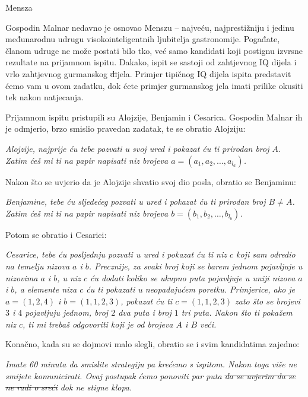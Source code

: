 \begin{statement}[
  problempoints=100,
  timelimit=1 sekunda,
  memorylimit=512 MiB,
]{Mensza}

Gospodin Malnar nedavno je osnovao Menszu -- najveću, najprestižniju i jedinu
međunarodnu udrugu visokointeligentnih ljubitelja gastronomije. Pogađate, članom
udruge ne može postati bilo tko, već samo kandidati koji postignu izvrsne
rezultate na prijamnom ispitu. Dakako, ispit se sastoji od zahtjevnog IQ dijela
i vrlo zahtjevnog gurmanskog \sout{di}jela. Primjer tipičnog IQ dijela ispita
predstavit ćemo vam u ovom zadatku, dok ćete primjer gurmanskog jela imati
prilike okusiti tek nakon natjecanja.

Prijamnom ispitu pristupili su Alojzije, Benjamin i Cesarica. Gospodin Malnar
ih je odmjerio, brzo smislio pravedan zadatak, te se obratio Alojziju:

\textit{Alojzije, najprije ću tebe pozvati u svoj ured i pokazat ću ti prirodan
  broj $A$.  Zatim ćeš mi ti na papir napisati niz brojeva $a = (a_1, a_2,
\ldots, a_{l_a})$.}

Nakon što se uvjerio da je Alojzije shvatio svoj dio posla, obratio se Benjaminu:

\textit{Benjamine, tebe ću sljedećeg pozvati u ured i pokazat ću ti prirodan
  broj $B \ne A$.  Zatim ćeš mi ti na papir napisati niz brojeva $b = (b_1, b_2,
\ldots, b_{l_b})$.}

Potom se obratio i Cesarici:

\textit{Cesarice, tebe ću posljednju pozvati u ured i pokazat ću ti niz $c$ koji
  sam odredio na temelju nizova $a$ i $b$. Precznije, za svaki broj koji se barem
  jednom pojavljuje u nizovima $a$ i $b$, u niz $c$ ću dodati koliko se ukupno puta
  pojavljuje u uniji nizova $a$ i $b$, a elemente niza $c$ ću ti pokazati u
  neopadajućem poretku. Primjerice, ako je $a = (1, 2, 4)$ i $b = (1, 1, 2, 3)$,
  pokazat ću ti $c = (1, 1, 2, 3)$ zato što se brojevi $3$ i $4$ pojavljuju jednom,
  broj $2$ dva puta i broj $1$ tri puta. Nakon što ti pokažem niz $c$, ti mi trebaš
  odgovoriti koji je od brojeva $A$ i $B$ veći.}

Konačno, kada su se dojmovi malo slegli, obratio se i svim kandidatima zajedno:

\textit{Imate 60 minuta da smislite strategiju pa krećemo s ispitom. Nakon toga
  više ne smijete komunicirati. Ovaj postupak ćemo ponoviti par puta 
  \sout{da se uvjerim da se ne radi o sreći} dok ne stigne klopa.}


\end{statement}
